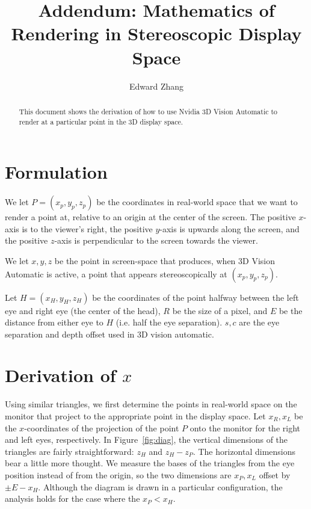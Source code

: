 \documentclass{article}
\begin{document}
\title{Addendum: Mathematics of Rendering in Stereoscopic Display Space}

\date{}
\author{Edward Zhang}
\maketitle
\onehalfspace
\thispagestyle{empty}

\begin{abstract}
This document shows the derivation of how to use Nvidia 3D Vision Automatic to render at a particular point in the 3D display space.
\end{abstract}
\section{Formulation}
We let $P = (x_p,y_p,z_p)$ be the coordinates in real-world space that we want to render a point at, relative to an origin at the center of the screen. The positive $x$-axis is to the viewer's right, the positive $y$-axis is upwards along the screen, and the positive $z$-axis is perpendicular to the screen towards the viewer.

We let $x,y,z$ be the point in screen-space that produces, when 3D Vision Automatic is active, a point that appears stereoscopically at $(x_p,y_p,z_p)$.

Let $H = (x_H,y_H,z_H)$ be the coordinates of the point halfway between the left eye and right eye (the center of the head), $R$ be the size of a pixel, and $E$ be the distance from either eye to $H$ (i.e. half the eye separation). $s,c$ are the eye separation and depth offset used in 3D vision automatic. 

\section{Derivation of $x$}
Using similar triangles, we first determine the points in real-world space on the monitor that project to the appropriate point in the display space. Let $x_R, x_L$ be the $x$-coordinates of the projection of the point $P$ onto the monitor for the right and left eyes, respectively. In Figure~\ref{fig:diag}, the vertical dimensions of the triangles are fairly straightforward: $z_H$ and $z_H - z_P$. The horizontal dimensions bear a little more thought. We measure the bases of the triangles from the eye position instead of from the origin, so the two dimensions are $x_P, x_L$ offset by $\pm E - x_H$. Although the diagram is drawn in a particular configuration, the analysis holds for the case where the $x_P < x_H$.  
\end{document}
